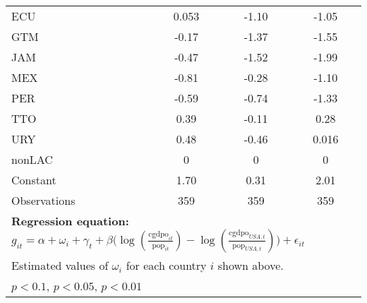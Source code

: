 \begin{sidewaystable}[htbp]
\begin{tabular}{l*{3}{c}}
ECU             &    0.053         &    -1.10\sym{***}&    -1.05\sym{**} \\
GTM             &    -0.17         &    -1.37\sym{***}&    -1.55\sym{***}\\
JAM             &    -0.47\sym{***}&    -1.52\sym{***}&    -1.99\sym{***}\\
MEX             &    -0.81\sym{***}&    -0.28         &    -1.10\sym{*}  \\
PER             &    -0.59\sym{***}&    -0.74         &    -1.33\sym{**} \\
TTO             &     0.39\sym{***}&    -0.11         &     0.28         \\
URY             &     0.48\sym{***}&    -0.46\sym{*}  &    0.016         \\
nonLAC          &        0         &        0         &        0         \\
Constant        &     1.70\sym{***}&     0.31         &     2.01\sym{*}  \\
\midrule
Observations    &      359         &      359         &      359         \\
\bottomrule
\multicolumn{4}{l}{\footnotesize \textbf{Regression equation:} \(g_{it} = \alpha  + \omega_i + \gamma_t + \beta \big(\log (\frac{\textrm{cgdpo}_{it}}{\textrm{pop}_{it}} ) - \log (\frac{\textrm{cgdpo}_{USA,t}}{\textrm{pop}_{USA,t}}  ) \big) + \epsilon_{it}\)}\\
\multicolumn{4}{l}{\footnotesize Estimated values of \(\omega_i\) for each country \(i\) shown above.}\\
\multicolumn{4}{l}{\footnotesize \sym{*} \(p<0.1\), \sym{**} \(p<0.05\), \sym{***} \(p<0.01\)}\\
\end{tabular}
\end{sidewaystable}
